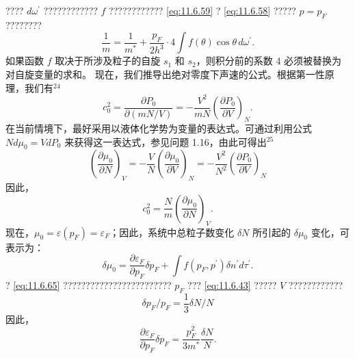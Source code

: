 ???? \(d\omega^{\prime}\) ???????????? \(f\) ???????????? \autoref{eq:11.6.59} ? \autoref{eq:11.6.58} ????? \(p=p_F\) ????????
\begin{equation}\tag{11.6.61}\label{eq:11.6.61}
\frac { 1 } { m } = \frac { 1 } { m ^{*} } + \frac { p _ { F } } { 2 h ^{3} } \cdot 4 \int f ( \theta ) \cos \theta \, d \omega ^{\prime} .
\end{equation}
如果函数 \(f\) 取决于所涉及粒子的自旋 \(s_{1}\) 和 \(s_{2}\)，则积分前的系数 4 必须被替换为对自旋变量的求和。
现在，我们推导出绝对零度下声速的公式。根据第一性原理，我们有\(^{24}\)
\begin{equation}\tag{11.6.62}\label{eq:11.6.62}
c _ { 0 } ^{2} = \frac { \partial P _ { 0 } } { \partial ( m N / V ) } = - \frac { V ^{2} } { m N } \left( \frac { \partial P _ { 0 } } { \partial V } \right) _ { N } .
\end{equation}
在当前情境下，最好采用以液体化学势为变量的表达式。可通过利用公式 \(Nd\mu_0 = VdP_0\) 来获得这一表达式，参见问题 1.16，由此可得出\(^{25}\)
\begin{equation}\tag{11.6.63}\label{eq:11.6.63}
\left( \frac { \partial \mu _ { 0 } } { \partial N } \right) _ { V } = - \frac { V } { N } \left( \frac { \partial \mu _ { 0 } } { \partial V } \right) _ { N } = - \frac { V ^{2} } { N ^{2} } \left( \frac { \partial P _ { 0 } } { \partial V } \right) _ { N }
\end{equation}
因此，
\begin{equation}\tag{11.6.64}\label{eq:11.6.64}
c _ { 0 } ^{2} = \frac { N } { m } \left( \frac { \partial \mu _ { 0 } } { \partial N } \right) _ { V } .
\end{equation}
现在，\(\mu_{0}=\varepsilon(p_{F})=\varepsilon_{F}\)；因此，系统中总粒子数变化 \(\delta N\) 所引起的 \(\delta\mu_{0}\) 变化，可表示为：
\begin{equation}\tag{11.6.65}\label{eq:11.6.65}
\delta \mu _ { 0 } = \frac { \partial \varepsilon _ { F } } { \partial p _ { F } } \delta p _ { F } + \int f ( p _ { F } , p ^{\prime} ) \delta n ^{\prime} d \tau ^{\prime} .
\end{equation}
? \autoref{eq:11.6.65} ???????????????????????? \(p_{F}\) ??? \autoref{eq:11.6.43} ????? \(V\) ????????????
\begin{equation}\tag{11.6.66}\label{eq:11.6.66}
\delta p _ { F } / p _ { F } = \frac { 1 } { 3 } \delta N / N
\end{equation}
因此，
\begin{equation}\tag{11.6.67}\label{eq:11.6.67}
\frac { \partial \varepsilon _ { F } } { \partial p _ { F } } \delta p _ { F } = \frac { p _ { F } ^{2} } { 3 m ^{*} } \frac { \delta N } { N } .
\end{equation}
